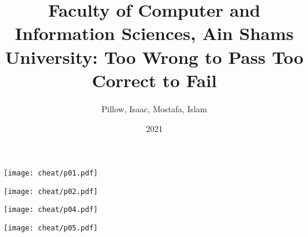 \documentclass[10pt]{article}
\title{\vspace{-4ex}\Large{Faculty of Computer and Information Sciences, Ain Shams University: Too Wrong to Pass Too Correct to Fail}}
\author{Pillow, Isaac, Mostafa, Islam}
\date{2021}
\begin{document}
\begin{landscape}
\begin{multicols}{2}

\maketitle
\vspace{-13ex}
\tableofcontents
\pagestyle{fancy}




\end{multicols}
\end{landscape}

\centerline{\texttt{[image: cheat/p01.pdf]}}
\centerline{\texttt{[image: cheat/p02.pdf]}}
\centerline{\texttt{[image: cheat/p04.pdf]}}
\centerline{\texttt{[image: cheat/p05.pdf]}}

\null
\end{document}
